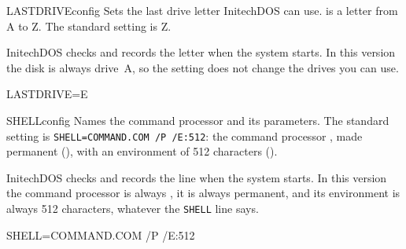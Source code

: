 \begin{DosEntry}{LASTDRIVE}{}{config}
\Purpose Sets the last drive letter InitechDOS can use.
\Format {}
\Remarks
{} is a letter from A to Z.  The standard setting is Z.

InitechDOS checks and records the letter when the system starts.  In this
version the disk is always drive~A, so the setting does not change the
drives you can use.
\Example
\begin{TypeIn}
LASTDRIVE=E
\end{TypeIn}
\end{DosEntry}

\begin{DosEntry}{SHELL}{}{config}
\Purpose Names the command processor and its parameters.
\Format {}
\Remarks
The standard setting is \texttt{SHELL=COMMAND.COM /P /E:512}: the command
processor , made permanent (), with an environment
of 512 characters ().

InitechDOS checks and records the line when the system starts.  In this
version the command processor is always , it is always
permanent, and its environment is always 512 characters, whatever the
\texttt{SHELL} line says.
\Example
\begin{TypeIn}
SHELL=COMMAND.COM /P /E:512
\end{TypeIn}
\end{DosEntry}
